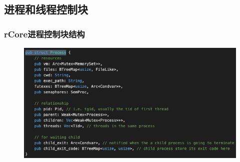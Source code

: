 \subsection{进程和线程控制块} %
\begin{frame}[fragile]
    \frametitle{rCore进程控制块结构}
    \begin{figure}
    \includegraphics[width=0.8\linewidth]{figs/process.png}
    \end{figure}
\end{frame}
% 
% 
% 
% 
% 

